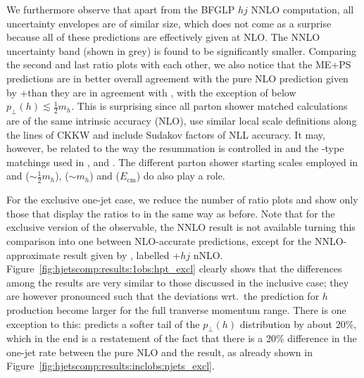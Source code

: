We furthermore observe that apart from the BFGLP $hj$ NNLO computation,
all uncertainty envelopes are of similar size, which does not come as
a surprise because all of these predictions are effectively given at
NLO. The NNLO uncertainty band (shown in grey) is found to be
significantly smaller. Comparing the second and last ratio plots with
each other, we also notice that the ME+PS predictions are in better
overall agreement with the pure NLO prediction given by
\GoSam{}+\Sherpa than they are in agreement with \Powheg, with the
exception of \MGaMC below $p_\perp(h)\lesssim\tfrac{1}{2}m_h$. This is
surprising since all parton shower matched calculations are of the
same intrinsic accuracy (NLO), use similar local scale definitions
along the lines of CKKW and include Sudakov factors of NLL accuracy.
It may, however, be related to the way the resummation is controlled
in \Powheg and the \MCatNLO-type matchings used in \MGaMC, \Herwig and
\Sherpa. The different parton shower starting scales employed in
\Herwig and \Sherpa ($\sim\tfrac{1}{2}m_h$), \MGaMC ($\sim m_h$) and
\Powheg ($E_\mathrm{cm}$) do also play a role.

For the exclusive one-jet case, we reduce the number of ratio plots
and show only those that display the ratios to \Powheg in the same way
as before. Note that for the exclusive version of the observable, the
NNLO result is not available turning this comparison into one between
NLO-accurate predictions, except for the NNLO-approximate result given
by \Loopsim, labelled \GoSam{}+\Sherpa $hj$ nNLO.
Figure~\ref{fig:hjetscomp:results:1obs:hpt_excl} clearly shows that
the differences among the results are very similar to those discussed
in the inclusive case; they are however pronounced such that the
deviations wrt.~the \Powheg \NNLOPS prediction for $h$ production
become larger for the full tranverse momentum range. There is one
exception to this: \Loopsim predicts a softer tail of the $p_\perp(h)$
distribution by about 20\%, which in the end is a restatement of the
fact that there is a 20\% difference in the one-jet rate between the
pure NLO and the \Loopsim result, as already shown in
Figure~\ref{fig:hjetscomp:results:inclobs:njets_excl}.

